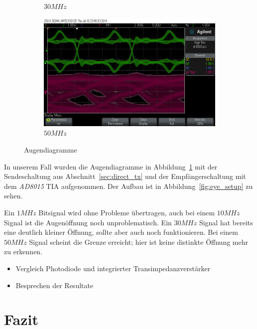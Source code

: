\documentclass[12pt,a4paper]{article}
\begin{document}
\begin{figure}
\begin{subfigure}[b]{0.6\textwidth}
    \caption{$30MHz$}
  \end{subfigure}  
  \begin{subfigure}[b]{0.6\textwidth}
    \includegraphics[width=\textwidth]{../measurements/20140710/eye_plots/50MHz.png}
    \caption{$50MHz$}
  \end{subfigure}  
  \caption{Augendiagramme}
  \label{fig:eye_plots}
\end{figure}

In unserem Fall wurden die Augendiagramme in Abbildung~\ref{fig:eye_plots} mit der Sendeschaltung aus Abschnitt~\ref{sec:direct_tx} und der Empfängerschaltung mit dem \textit{AD8015} TIA aufgenommen. Der Aufbau ist in Abbildung~\ref{fig:eye_setup} zu sehen.

Ein $1MHz$ Bitsignal wird ohne Probleme übertragen, auch bei einem $10MHz$ Signal ist die Augenöffnung noch unproblematisch. Ein $30MHz$ Signal hat bereits eine deutlich kleiner Öffnung, sollte aber auch noch funktionieren. Bei einem $50MHz$ Signal scheint die Grenze erreicht; hier ist keine distinkte Öffnung mehr zu erkennen. 

\begin{itemize}
\item Vergleich Photodiode und integrierter Transimpedanzverstärker
\item Besprechen der Resultate
\end{itemize}

\section{Fazit}
\end{document}
